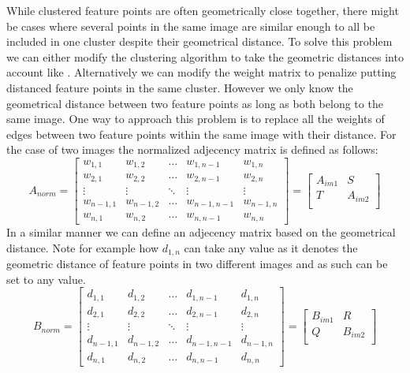 \documentclass{article}
\begin{document}
While clustered feature points are often geometrically close together, 
there might be cases where several points in the same image are similar 
enough to all be included in one cluster despite their geometrical 
distance.  To solve this problem we can either modify the clustering 
algorithm to take the geometric distances into account like 
\cite{das2008event}.  Alternatively we can modify the weight matrix to 
penalize putting distanced feature points in the same cluster. However 
we only know the geometrical distance between two feature points as long 
as both belong to the same image. One way to approach this problem is to 
replace all the weights of edges between two feature points within the 
same image with their distance. For the case of two images the 
normalized adjecency matrix is defined as follows:
%
$$A_{norm}=
\begin{bmatrix}
w_{1,1}   & w_{1,2}   & \ldots & w_{1,n-1}   & w_{1,n}     \\
w_{2,1}   & w_{2,2}   & \ldots & w_{2,n-1}   & w_{2,n}     \\
\vdots    & \vdots    & \ddots & \vdots      & \vdots      \\
w_{n-1,1} & w_{n-1,2} & \ldots & w_{n-1,n-1} & w_{n-1,n}   \\
w_{n,1}   & w_{n,2}   & \ldots & w_{n,n-1}   & w_{n,n}
\end{bmatrix}=
\begin{bmatrix}
A_{im1} & S       \\
T       & A_{im2} \\
\end{bmatrix}
$$
%
In a similar manner we can define an adjecency matrix based on the 
geometrical distance. Note for example how $d_{1,n}$ can take any value 
as it denotes the geometric distance of feature points in two different 
images and as such can be set to any value.
%
$$B_{norm}=
\begin{bmatrix}
d_{1,1}   & d_{1,2}   & \ldots & d_{1,n-1}   & d_{1,n}     \\
d_{2,1}   & d_{2,2}   & \ldots & d_{2,n-1}   & d_{2,n}     \\
\vdots    & \vdots    & \ddots & \vdots      & \vdots      \\
d_{n-1,1} & d_{n-1,2} & \ldots & d_{n-1,n-1} & d_{n-1,n}   \\
d_{n,1}   & d_{n,2}   & \ldots & d_{n,n-1}   & d_{n,n}
\end{bmatrix}=
\begin{bmatrix}
B_{im1} & R       \\
Q       & B_{im2} \\
\end{bmatrix}
$$
\end{document}
